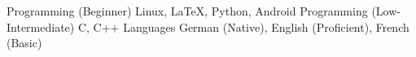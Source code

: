 \begin{cvskills}
  \cvskill
    {Programming} %
	{(Beginner)} 
    {Linux, LaTeX, Python, Android} %
  \cvskill
    {Programming}
    {(Low-Intermediate)}
    {C, C++}
  \cvskill
    {Languages}
    {}
    {German (Native), English (Proficient), French (Basic)}
\medskip
\end{cvskills}

